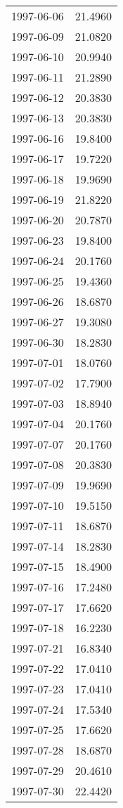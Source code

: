 \begin{tabular}{lr}
1997-06-06 &     21.4960 \\
1997-06-09 &     21.0820 \\
1997-06-10 &     20.9940 \\
1997-06-11 &     21.2890 \\
1997-06-12 &     20.3830 \\
1997-06-13 &     20.3830 \\
1997-06-16 &     19.8400 \\
1997-06-17 &     19.7220 \\
1997-06-18 &     19.9690 \\
1997-06-19 &     21.8220 \\
1997-06-20 &     20.7870 \\
1997-06-23 &     19.8400 \\
1997-06-24 &     20.1760 \\
1997-06-25 &     19.4360 \\
1997-06-26 &     18.6870 \\
1997-06-27 &     19.3080 \\
1997-06-30 &     18.2830 \\
1997-07-01 &     18.0760 \\
1997-07-02 &     17.7900 \\
1997-07-03 &     18.8940 \\
1997-07-04 &     20.1760 \\
1997-07-07 &     20.1760 \\
1997-07-08 &     20.3830 \\
1997-07-09 &     19.9690 \\
1997-07-10 &     19.5150 \\
1997-07-11 &     18.6870 \\
1997-07-14 &     18.2830 \\
1997-07-15 &     18.4900 \\
1997-07-16 &     17.2480 \\
1997-07-17 &     17.6620 \\
1997-07-18 &     16.2230 \\
1997-07-21 &     16.8340 \\
1997-07-22 &     17.0410 \\
1997-07-23 &     17.0410 \\
1997-07-24 &     17.5340 \\
1997-07-25 &     17.6620 \\
1997-07-28 &     18.6870 \\
1997-07-29 &     20.4610 \\
1997-07-30 &     22.4420 \\

\end{tabular}
